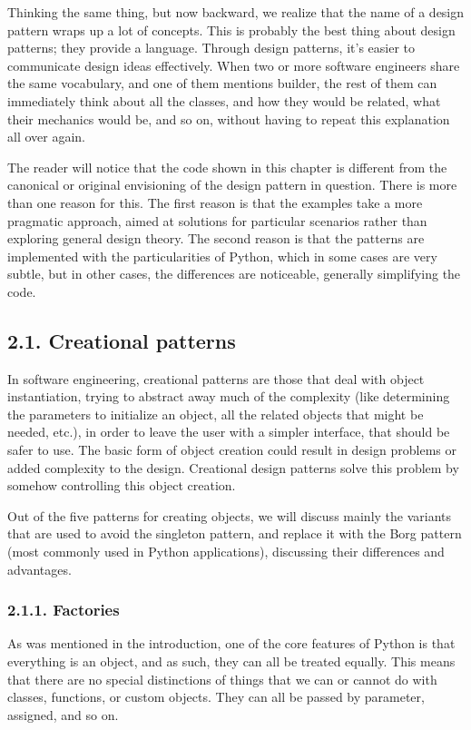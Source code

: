 \documentclass[a4paper,10pt,english]{sphinxmanual}
\begin{document}
Thinking the same thing, but now backward, we realize that the name of a design pattern
wraps up a lot of concepts. This is probably the best thing about design patterns; they
provide a language. Through design patterns, it’s easier to communicate design ideas
effectively. When two or more software engineers share the same vocabulary, and one of
them mentions builder, the rest of them can immediately think about all the classes, and
how they would be related, what their mechanics would be, and so on, without having to
repeat this explanation all over again.

The reader will notice that the code shown in this chapter is different from the canonical or
original envisioning of the design pattern in question. There is more than one reason for
this. The first reason is that the examples take a more pragmatic approach, aimed at
solutions for particular scenarios rather than exploring general design theory. The second
reason is that the patterns are implemented with the particularities of Python, which in
some cases are very subtle, but in other cases, the differences are noticeable, generally
simplifying the code.


\subsection{2.1. Creational patterns}
\label{\detokenize{chapters/9_design_patterns/index:creational-patterns}}
In software engineering, creational patterns are those that deal with object instantiation,
trying to abstract away much of the complexity (like determining the parameters to
initialize an object, all the related objects that might be needed, etc.), in order to leave the
user with a simpler interface, that should be safer to use. The basic form of object creation
could result in design problems or added complexity to the design. Creational design
patterns solve this problem by somehow controlling this object creation.

Out of the five patterns for creating objects, we will discuss mainly the variants that are
used to avoid the singleton pattern, and replace it with the Borg pattern (most commonly
used in Python applications), discussing their differences and advantages.


\subsubsection{2.1.1. Factories}
\label{\detokenize{chapters/9_design_patterns/index:factories}}
As was mentioned in the introduction, one of the core features of Python is that everything
is an object, and as such, they can all be treated equally. This means that there are no special
distinctions of things that we can or cannot do with classes, functions, or custom objects.
They can all be passed by parameter, assigned, and so on.
\end{document}
